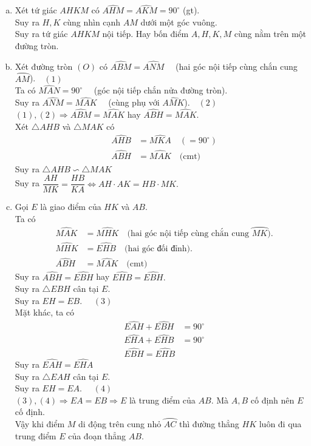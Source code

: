 \begin{bt}
{		\begin{enumerate}[a)]
			\item  Xét tứ giác $AHKM$ có $\widehat{AHM} =\widehat{AKM} =90^{\circ}$ (gt).\\
			Suy ra $H,K$ cùng nhìn cạnh $AM$ dưới một góc vuông.\\
			Suy ra tứ giác $AHKM$ nội tiếp. Hay bốn điểm $A,H,K,M$ cùng nằm trên một đường tròn.
			\item Xét đường tròn $(O)$ có $\widehat{ABM}= \widehat{ANM}\quad$ (hai góc nội tiếp cùng chắn cung $\wideparen{AM}$).$\quad (1)$\\
			Ta có $\widehat{MAN}=90^{\circ}\quad$ (góc nội tiếp chắn nửa đường tròn).\\
			Suy ra $\widehat{ANM}=\widehat{MAK} \quad$  (cùng phụ với $\widehat{AMK}$).$\quad (2)$\\
			$(1),(2) \Rightarrow \widehat{ABM}=\widehat{MAK}$ hay $\widehat{ABH}=\widehat{MAK}$.\\
			Xét $\triangle AHB$ và $\triangle MAK$ có
			\begin{eqnarray*}
				&\widehat{AHB}&=\widehat{MKA} \quad (=90^{\circ})\\
				&\widehat{ABH}&=\widehat{MAK} \quad \text{(cmt)}
			\end{eqnarray*}
			Suy ra $\triangle AHB \backsim \triangle MAK \quad $ \\
			Suy ra $\dfrac{AH}{MK}=\dfrac{HB}{KA} \Leftrightarrow AH\cdot AK=HB \cdot MK.$
			\item Gọi $E$ là giao điểm của $HK$ và $AB$.\\
			Ta có 
			\begin{eqnarray*}
				&\widehat{MAK} &= \widehat{MHK} \quad \text{(hai góc nội tiếp cùng chắn cung } \wideparen{MK}).\\
				&\widehat{MHK} &= \widehat{EHB}\quad \text{(hai góc đối đỉnh).}\\
				&\widehat{ABH}&=\widehat{MAK} \quad \text{(cmt)}
			\end{eqnarray*} 
			Suy ra $\widehat{ABH} =\widehat{EBH}$ hay $\widehat{EHB} =\widehat{EBH}.$\\
			Suy ra $\triangle EBH$ cân tại $E$.\\
			Suy ra $EH=EB.$ $\quad (3)$\\
			Mặt khác, ta có 
			\begin{eqnarray*}
				&\widehat{EAH} + \widehat{EBH} &= 90^{\circ}\\
				&\widehat{EHA} + \widehat{EHB} &= 90^{\circ}\\
				&\widehat{EBH}=\widehat{EHB} &
			\end{eqnarray*} 
			Suy ra $\widehat{EAH} =\widehat{EHA}$ \\
			Suy ra $\triangle EAH$ cân tại $E$.\\
			Suy ra $EH=EA.$ $\quad (4)$\\
			$(3),(4) \Rightarrow EA=EB \Rightarrow E$ là trung điểm của $AB$. Mà $A,B$ cố định nên $E$ cố định.\\
			Vậy khi điểm $M$ di động trên cung nhỏ $\wideparen{AC}$ thì đường thẳng $HK$ luôn đi qua trung điểm $E$ của đoạn thẳng $AB$.
		\end{enumerate}
	}
\end{bt}

